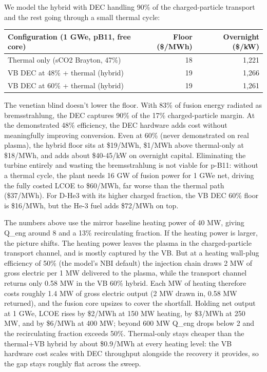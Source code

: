 \documentclass{article}
\begin{document}
We model the hybrid with DEC handling 90\% of the charged-particle
transport and the rest going through a small thermal cycle:

\begin{table}[h]
\centering
\begin{tabular}{lrr}
\toprule
Configuration (1 GWe, pB11, free core) & Floor (\$/MWh) & Overnight (\$/kW) \\
\midrule
Thermal only (sCO2 Brayton, 47\%) & 18 & 1,221 \\
VB DEC at 48\% + thermal (hybrid) & 19 & 1,266 \\
VB DEC at 60\% + thermal (hybrid) & 19 & 1,261 \\
\bottomrule
\end{tabular}
\end{table}

The venetian blind doesn't lower the floor. With 83\% of fusion energy
radiated as bremsstrahlung, the DEC captures 90\% of the 17\%
charged-particle margin. At the demonstrated 48\% efficiency, the DEC
hardware adds cost without meaningfully improving conversion. Even at
60\% (never demonstrated on real plasma), the hybrid floor sits at
\$19/MWh, \$1/MWh above thermal-only at \$18/MWh, and adds about
\$40-45/kW on overnight capital. Eliminating the turbine entirely and wasting the
bremsstrahlung is not viable for p-B11: without a thermal cycle, the
plant needs 16 GW of fusion power for 1 GWe net, driving the fully
costed LCOE to \$60/MWh, far worse than the thermal path (\$37/MWh). For
D-He3 with its higher charged fraction, the VB DEC 60\% floor is
\$16/MWh, but the He-3 fuel adds \$72/MWh on top.

The numbers above use the mirror baseline heating power of 40 MW, giving
Q\_eng around 8 and a 13\% recirculating fraction. If the heating power
is larger, the picture shifts. The heating power leaves the plasma in
the charged-particle transport channel, and is mostly captured by the
VB. But at a heating wall-plug efficiency of 50\% (the model's NBI
default) the injection chain draws 2 MW of gross electric per 1 MW
delivered to the plasma, while the transport channel returns only 0.58
MW in the VB 60\% hybrid. Each MW of heating therefore costs roughly 1.4
MW of gross electric output (2 MW drawn in, 0.58 MW returned), and the
fusion core upsizes to cover the shortfall. Holding net output at 1 GWe,
LCOE rises by \$2/MWh at 150 MW heating, by \$3/MWh at 250 MW, and by
\$6/MWh at 400 MW; beyond 600 MW Q\_eng drops below 2 and the
recirculating fraction exceeds 50\%. Thermal-only stays cheaper than the
thermal+VB hybrid by about \$0.9/MWh at every heating level: the VB
hardware cost scales with DEC throughput alongside the recovery it
provides, so the gap stays roughly flat across the sweep.
\end{document}
